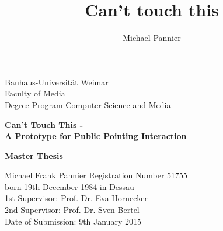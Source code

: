 
\begin{titlepage}
\large
\noindent
Bauhaus-Universität Weimar\\
Faculty of Media\\
Degree Program Computer Science and Media\\
\author{Michael Pannier}
\title{Can't touch this}
\vspace{20mm}
\begin{center}
    \huge{\bfseries{Can't Touch This -\\
		A Prototype for Public Pointing Interaction}}
\end{center}
\vspace{15mm}
\begin{center}
    \huge{\bfseries{Master Thesis}}\\
\end{center}
\vspace{20mm}
Michael Frank Pannier
\hfill Registration Number 51755\\
born 19th December 1984 in Dessau\\
\newline
\newline
1st Supervisor: Prof. Dr. Eva Hornecker\\
2nd Supervisor: Prof. Dr. Sven Bertel\\
\vfil
\noindent
Date of Submission: 9th January 2015\\
\end{titlepage}
